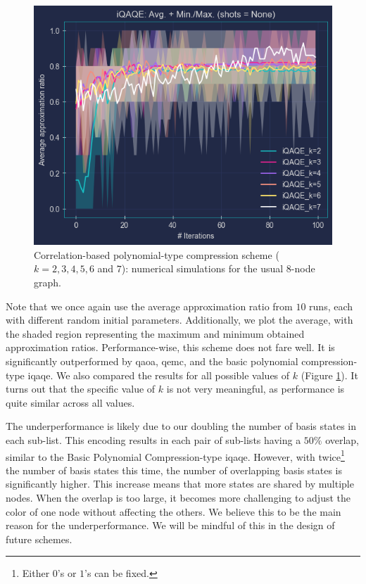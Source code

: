\footnotetext[\value{footnote}]{This refers to the scenario where only $1$'s are fixed, not $0$'s.}

\clearpage

\begin{figure}[H]
  \centering
  \includegraphics[width=\textwidth]{Figures/Chapter_5/Correlation-based/All_k's.png}
  \caption{Correlation-based polynomial-type compression scheme ($k = 2, 3, 4, 5, 6$ and $7$): numerical simulations for the usual $8$-node graph.}
  \label{fig:All_k's}
\end{figure}

Note that we once again use the average approximation ratio from $10$ runs, each with different random initial parameters. Additionally, we plot the average, with the shaded region representing the maximum and minimum obtained approximation ratios. Performance-wise, this scheme does not fare well. It is significantly outperformed by \acrshort{qaoa}, \acrshort{qemc}, and the basic polynomial compression-type \acrshort{iqaqe}. We also compared the results for all possible values of $k$ (Figure \ref{fig:All_k's}). It turns out that the specific value of $k$ is not very meaningful, as performance is quite similar across all values.

The underperformance is likely due to our doubling the number of basis states in each sub-list. This encoding results in each pair of sub-lists having a $50\%$ overlap, similar to the Basic Polynomial Compression-type \acrshort{iqaqe}. However, with twice\footnote{Either $0$'s or $1$'s can be fixed.} the number of basis states this time, the number of overlapping basis states is significantly higher. This increase means that more states are shared by multiple nodes. When the overlap is too large, it becomes more challenging to adjust the color of one node without affecting the others. We believe this to be the main reason for the underperformance. We will be mindful of this in the design of future schemes.

